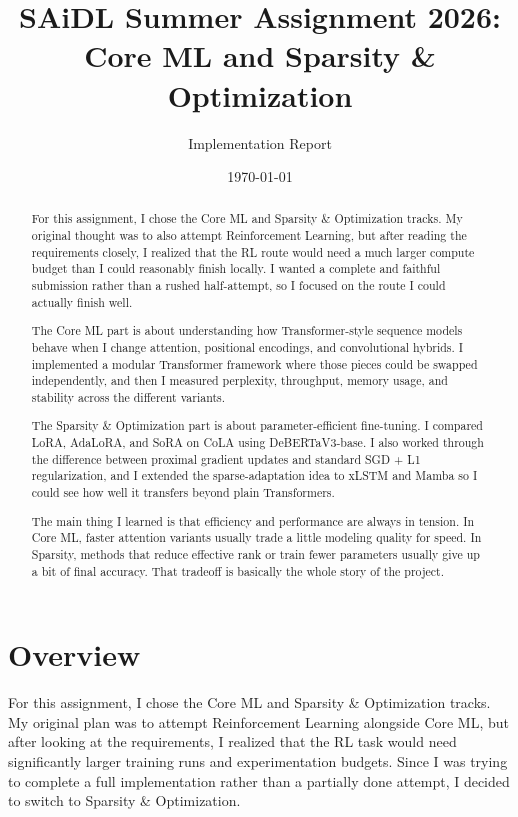 \documentclass[11pt]{article}
\title{SAiDL Summer Assignment 2026: Core ML and Sparsity \& Optimization}
\author{Implementation Report}
\date{\today}
\begin{document}
\maketitle

\begin{abstract}
For this assignment, I chose the Core ML and Sparsity \& Optimization tracks. My original thought was to also attempt Reinforcement Learning, but after reading the requirements closely, I realized that the RL route would need a much larger compute budget than I could reasonably finish locally. I wanted a complete and faithful submission rather than a rushed half-attempt, so I focused on the route I could actually finish well.

The Core ML part is about understanding how Transformer-style sequence models behave when I change attention, positional encodings, and convolutional hybrids. I implemented a modular Transformer framework where those pieces could be swapped independently, and then I measured perplexity, throughput, memory usage, and stability across the different variants.

The Sparsity \& Optimization part is about parameter-efficient fine-tuning. I compared LoRA, AdaLoRA, and SoRA on CoLA using DeBERTaV3-base. I also worked through the difference between proximal gradient updates and standard SGD + L1 regularization, and I extended the sparse-adaptation idea to xLSTM and Mamba so I could see how well it transfers beyond plain Transformers.

The main thing I learned is that efficiency and performance are always in tension. In Core ML, faster attention variants usually trade a little modeling quality for speed. In Sparsity, methods that reduce effective rank or train fewer parameters usually give up a bit of final accuracy. That tradeoff is basically the whole story of the project.
\end{abstract}

\section{Overview}
For this assignment, I chose the Core ML and Sparsity \& Optimization tracks. My original plan was to attempt Reinforcement Learning alongside Core ML, but after looking at the requirements, I realized that the RL task would need significantly larger training runs and experimentation budgets. Since I was trying to complete a full implementation rather than a partially done attempt, I decided to switch to Sparsity \& Optimization.
\end{document}
